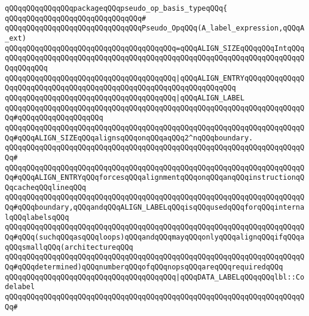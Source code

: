 \verb|qQQqqQQqqQQqqQQqpackageqQQqpseudo_op_basis_typeqQQq{|\newline
\verb|qQQqqQQqqQQqqQQqqQQqqQQqqQQqqQQq#|\newline
\verb|qQQqqQQqqQQqqQQqqQQqqQQqqQQqqQQqPseudo_OpqQQq(A_label_expression,qQQqA_ext)|\newline
\newline
\verb|qQQqqQQqqQQqqQQqqQQqqQQqqQQqqQQqqQQqqQQq=qQQqALIGN_SIZEqQQqqQQqIntqQQqqQQqqQQqqQQqqQQqqQQqqQQqqQQqqQQqqQQqqQQqqQQqqQQqqQQqqQQqqQQqqQQqqQQqqQQqqQQqqQQq|\newline
\verb|qQQqqQQqqQQqqQQqqQQqqQQqqQQqqQQqqQQqqQQq|\verb#|qQQqALIGN_ENTRYqQQqqQQqqQQqqQQqqQQqqQQqqQQqqQQqqQQqqQQqqQQqqQQqqQQqqQQqqQQqqQQqqQQq#\newline
\verb|qQQqqQQqqQQqqQQqqQQqqQQqqQQqqQQqqQQqqQQq|\verb#|qQQqALIGN_LABEL#\newline
\verb|qQQqqQQqqQQqqQQqqQQqqQQqqQQqqQQqqQQqqQQqqQQqqQQqqQQqqQQqqQQqqQQqqQQqqQQq#qQQqqQQqqQQqqQQqqQQq|\newline
\verb|qQQqqQQqqQQqqQQqqQQqqQQqqQQqqQQqqQQqqQQqqQQqqQQqqQQqqQQqqQQqqQQqqQQqqQQq#qQQqALIGN_SIZEqQQqalignsqQQqonqQQqaqQQq2^nqQQqboundary.|\newline
\verb|qQQqqQQqqQQqqQQqqQQqqQQqqQQqqQQqqQQqqQQqqQQqqQQqqQQqqQQqqQQqqQQqqQQqqQQq#|\newline
\verb|qQQqqQQqqQQqqQQqqQQqqQQqqQQqqQQqqQQqqQQqqQQqqQQqqQQqqQQqqQQqqQQqqQQqqQQq#qQQqALIGN_ENTRYqQQqforcesqQQqalignmentqQQqonqQQqanqQQqinstructionqQQqcacheqQQqlineqQQq|\newline
\verb|qQQqqQQqqQQqqQQqqQQqqQQqqQQqqQQqqQQqqQQqqQQqqQQqqQQqqQQqqQQqqQQqqQQqqQQq#qQQqboundary,qQQqandqQQqALIGN_LABELqQQqisqQQqusedqQQqforqQQqinternalqQQqlabelsqQQq|\newline
\verb|qQQqqQQqqQQqqQQqqQQqqQQqqQQqqQQqqQQqqQQqqQQqqQQqqQQqqQQqqQQqqQQqqQQqqQQq#qQQq(suchqQQqasqQQqloops)qQQqandqQQqmayqQQqonlyqQQqalignqQQqifqQQqaqQQqsmallqQQq(architectureqQQq|\newline
\verb|qQQqqQQqqQQqqQQqqQQqqQQqqQQqqQQqqQQqqQQqqQQqqQQqqQQqqQQqqQQqqQQqqQQqqQQq#qQQqdetermined)qQQqnumberqQQqofqQQqnopsqQQqareqQQqrequiredqQQq|\newline
\newline
\newline
\newline
\verb|qQQqqQQqqQQqqQQqqQQqqQQqqQQqqQQqqQQqqQQq|\verb#|qQQqDATA_LABELqQQqqQQqlbl::Codelabel#\newline
\verb|qQQqqQQqqQQqqQQqqQQqqQQqqQQqqQQqqQQqqQQqqQQqqQQqqQQqqQQqqQQqqQQqqQQqqQQq#|\newline
